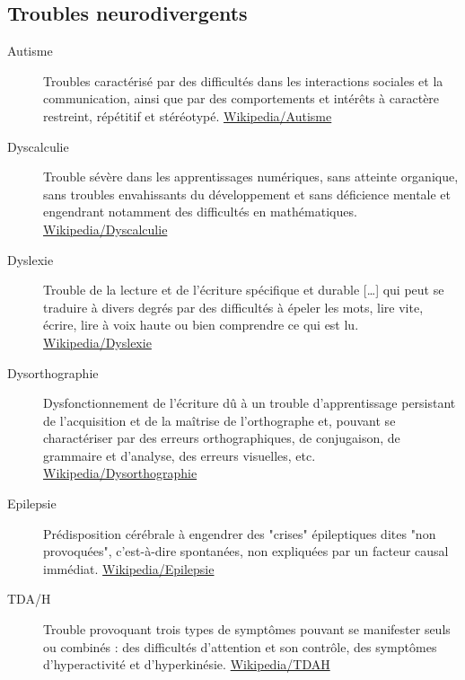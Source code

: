 \documentclass[a4paper,12pt]{article}
\begin{document}
\begin{multicols}{2}
\subsection*{Troubles neurodivergents}
\label{sec:orgc9b6bed}
\begin{description}
\item[{Autisme}] Troubles caractérisé par des difficultés dans les interactions sociales et la communication, ainsi que par des comportements et intérêts à caractère restreint, répétitif et stéréotypé. \href{https://fr.wikipedia.org/wiki/Autisme}{Wikipedia/Autisme}
\item[{Dyscalculie}] Trouble sévère dans les apprentissages numériques, sans atteinte organique, sans troubles envahissants du développement et sans déficience mentale et engendrant notamment des difficultés en mathématiques. \href{https://fr.wikipedia.org/wiki/Dyscalculie}{Wikipedia/Dyscalculie}
\item[{Dyslexie}] Trouble de la lecture et de l'écriture spécifique et durable [\ldots{}] qui peut se traduire à divers degrés par des difficultés à épeler les mots, lire vite, écrire, lire à voix haute ou bien comprendre ce qui est lu. \href{https://fr.wikipedia.org/wiki/Dyslexie}{Wikipedia/Dyslexie}
\item[{Dysorthographie}] Dysfonctionnement de l’écriture dû à un trouble d'apprentissage persistant de l’acquisition et de la maîtrise de l’orthographe et, pouvant se charactériser par des erreurs orthographiques, de conjugaison, de grammaire et d’analyse, des erreurs visuelles, etc. \href{https://fr.wikipedia.org/wiki/Dysorthographie}{Wikipedia/Dysorthographie}
\item[{Epilepsie}] Prédisposition cérébrale à engendrer des "crises" épileptiques dites "non provoquées", c'est-à-dire spontanées, non expliquées par un facteur causal immédiat. \href{https://fr.wikipedia.org/wiki/\%C3\%89pilepsie}{Wikipedia/Epilepsie}
\item[{TDA/H}] Trouble provoquant trois types de symptômes pouvant se manifester seuls ou combinés : des difficultés d'attention et son contrôle, des symptômes d'hyperactivité et d'hyperkinésie. \href{https://fr.wikipedia.org/wiki/Trouble\_du\_d\%C3\%A9ficit\_de\_l\%27attention\_avec\_ou\_sans\_hyperactivit\%C3\%A9}{Wikipedia/TDAH}
\end{description}

\end{multicols}
\end{document}
